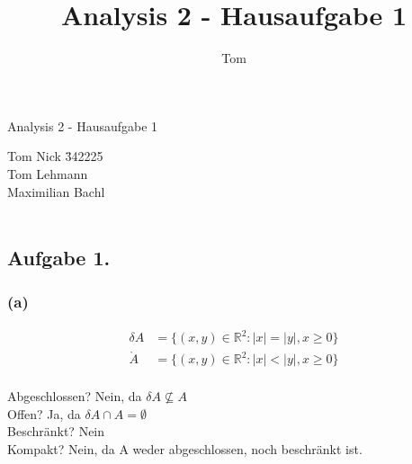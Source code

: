 \documentclass[10pt,a4paper]{article}
\author{Tom}
\title{Analysis 2 - Hausaufgabe 1}
\newcommand{\R}{\mathbb{R}}
\begin{document}
\begin{center}
\Large{Analysis 2 - Hausaufgabe 1} \\
\end{center}
\begin{tabbing}
Tom Nick \hspace{1.4cm}\= 342225\\
Tom Lehmann\\
Maximilian Bachl\\\\ 
\end{tabbing}
\subsection*{Aufgabe 1.}
\subsubsection*{\textbf{(a)}}
\begin{floatingfigure}[r]{150pt}
\end{floatingfigure}
\begin{align*}
\delta A &= \lbrace \left( x , y \right) \in \R ^2 : |x| = |y| , x \geq 0 \rbrace \\
\mathring{A} &= \lbrace \left( x,y \right) \in \R ^2 : |x| < |y|, x \geq 0 \rbrace
\end{align*}\\
Abgeschlossen? Nein, da  $\delta A \not \subseteq A$\\
Offen? Ja, da $\delta A \cap A = \emptyset$\\
Beschränkt? Nein\\
Kompakt? Nein, da A weder abgeschlossen, noch beschränkt ist.\\
\end{document}
